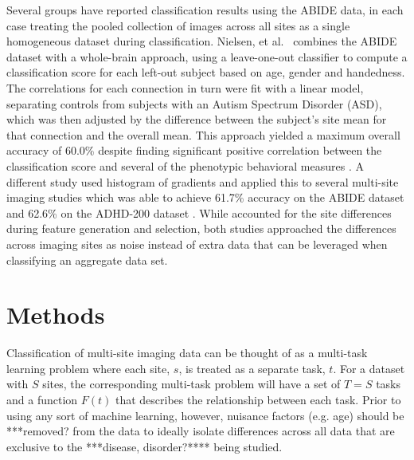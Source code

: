 \documentclass{llncs}
\begin{document}
Several groups have reported classification results using the ABIDE data, in
each case treating the pooled collection of images across all sites as a single
homogeneous dataset during classification. Nielsen, et al.~\cite{Jared} combines
the ABIDE dataset with a whole-brain approach, using a leave-one-out classifier
to compute a classification score for each left-out subject based on age, gender
and handedness. The correlations for each connection in turn were fit with a
linear model, separating controls from subjects with an Autism Spectrum Disorder (ASD), which was then adjusted by the
difference between the subject's site mean for that connection and the overall
mean. This approach yielded a maximum overall accuracy of 60.0\% despite finding
significant positive correlation between the classification score and several of
the phenotypic behavioral measures \cite{Jared}. A different study used
histogram of gradients and applied this to several multi-site imaging studies
which was able to achieve 61.7\% accuracy on the ABIDE dataset and 62.6\% on the
ADHD-200 dataset \cite{ghiassian}. While \cite{Jared} accounted for the site
differences during feature generation and selection, both studies approached the
differences across imaging sites as noise instead of extra data that can be
leveraged when classifying an aggregate data set.

  

\section{Methods}
Classification of multi-site imaging data can be thought of as a multi-task learning problem where each site,  $s$, is treated as a separate task, $t$.  For a dataset with $S$ sites, the corresponding multi-task problem will have a set of $T = S$ tasks and a function $F(t)$ that describes the relationship between each task.
Prior to using any sort of machine learning, however, nuisance factors (e.g. age) should be ***removed? from the data to ideally isolate differences across all data that are exclusive to the ***disease, disorder?**** being studied.
\end{document}
